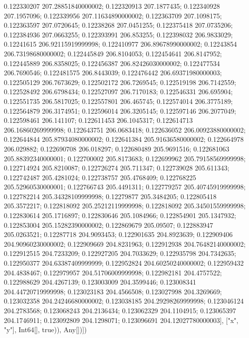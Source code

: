 0.122330207 207.28851840000002; 0.122320913 207.1877435; 0.122340928 207.1957096; 0.122339956 207.11634890000002; 0.122363709 207.1098175; 0.122363597 207.0720645; 0.12238268 207.0451255; 0.122375418 207.0735206; 0.122384936 207.0663255; 0.122393991 206.853255; 0.122398032 206.9833029; 0.12241615 206.92115919999998; 0.122410977 206.89678990000002; 0.12243854 206.73198680000002; 0.122445849 206.8104053; 0.122454641 206.8147952; 0.122445889 206.8358025; 0.122456387 206.82426030000002; 0.122477534 206.7690546; 0.122481575 206.8443039; 0.122476442 206.69371980000003; 0.122505129 206.7673629; 0.122502172 206.7269545; 0.122519198 206.7142559; 0.122528492 206.6798434; 0.122527097 206.7170183; 0.122546331 206.695904; 0.122551735 206.5817025; 0.122557801 206.465745; 0.122574014 206.3775189; 0.122564879 206.3174951; 0.122596014 206.3205145; 0.122597146 206.2077049; 0.122598461 206.141107; 0.122611453 206.1045317; 0.122614713 206.16860269999998; 0.122643751 206.0683418; 0.122636052 206.00923880000002; 0.122644844 205.87934080000002; 0.122641384 205.91636580000002; 0.122664978 206.029882; 0.122690708 206.018297; 0.122680489 205.9691516; 0.122681063 205.88392340000001; 0.122700002 205.8173683; 0.122699962 205.79158569999998; 0.122714924 205.8210087; 0.122726274 205.711347; 0.122739028 205.611343; 0.122742487 205.4281024; 0.122738757 205.4768409; 0.122768225 205.52960530000001; 0.122766743 205.4491311; 0.122779257 205.40745919999998; 0.122782214 205.34328109999998; 0.12279877 205.3484205; 0.122805418 205.3572217; 0.122818092 205.25212119999998; 0.122818092 205.34501559999998; 0.122830614 205.1716897; 0.122830646 205.1084966; 0.122854901 205.1347932; 0.122853004 205.15282390000002; 0.122869679 205.09507; 0.122883947 205.0263521; 0.12287718 204.9093453; 0.122901635 204.8923639; 0.122909406 204.90960230000002; 0.122909669 204.8231963; 0.122912938 204.76482140000002; 0.122912515 204.7233209; 0.122927205 204.7033629; 0.122935798 204.7342635; 0.122950377 204.63387409999999; 0.122952824 204.60250240000002; 0.122959432 204.4838467; 0.122979957 204.51706009999998; 0.122982181 204.4757522; 0.122988629 204.4267139; 0.123003009 204.3599446; 0.123008341 204.44720719999998; 0.123023183 204.4566508; 0.123027998 204.3269669; 0.123032358 204.24246680000002; 0.123038185 204.29298269999998; 0.123046124 204.2783568; 0.123068243 204.2136434; 0.123062329 204.1104915; 0.123065397 204.1746911; 0.123092809 204.1298071; 0.123096691 204.12027780000003], ["x", "y"], Int64[], true)), Any[])])